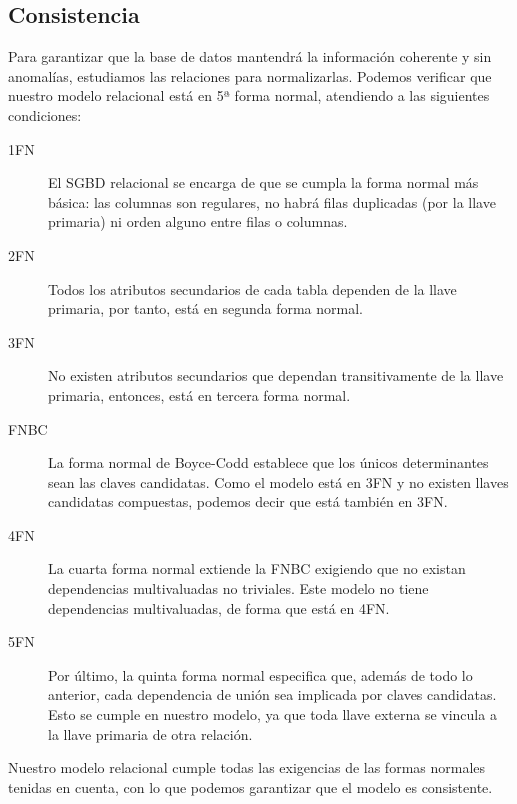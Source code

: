 \smallskip

\subsection{Consistencia}

Para garantizar que la base de datos mantendrá la información coherente y sin anomalías, estudiamos las relaciones para normalizarlas. Podemos verificar que nuestro modelo relacional está en 5ª forma normal, atendiendo a las siguientes condiciones:

\begin{description}
	\item[1FN] El \acrshort{SGBD} relacional se encarga de que se cumpla la forma normal más básica: las columnas son regulares, no habrá filas duplicadas (por la llave primaria) ni orden alguno entre filas o columnas. \cite{wiki_1fn}
	\item[2FN] Todos los atributos secundarios de cada tabla dependen de la llave primaria, por tanto, está en segunda forma normal. \cite{wiki_2fn}
	\item[3FN] No existen atributos secundarios que dependan transitivamente de la llave primaria, entonces, está en tercera forma normal. \cite{wiki_3fn}
	\item[FNBC] La forma normal de Boyce-Codd establece que los únicos determinantes sean las claves candidatas. Como el modelo está en 3FN y no existen llaves candidatas compuestas, podemos decir que está también en 3FN. \cite{wiki_fnbc}
	\item[4FN] La cuarta forma normal extiende la FNBC exigiendo que no existan dependencias multivaluadas no triviales. Este modelo no tiene dependencias multivaluadas, de forma que está en 4FN. \cite{wiki_4fn}
	\item[5FN] Por último, la quinta forma normal especifica que, además de todo lo anterior, cada dependencia de unión sea implicada por claves candidatas. Esto se cumple en nuestro modelo, ya que toda llave externa se vincula a la llave primaria de otra relación. \cite{wiki_5fn}
\end{description}

Nuestro modelo relacional cumple todas las exigencias de las formas normales tenidas en cuenta, con lo que podemos garantizar que el modelo es consistente.

\smallskip

